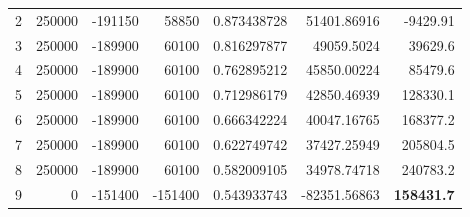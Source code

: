 \documentclass[12pt]{article}
\begin{document}
\begin{landscape}
\begin{table}[htbp]
\begin{tabular}{rrrrrrr}
    2     & 250000 & -191150 & 58850 & 0.873438728 & 51401.86916 & -9429.91 \\
    3     & 250000 & -189900 & 60100 & 0.816297877 & 49059.5024 & 39629.6 \\
    4     & 250000 & -189900 & 60100 & 0.762895212 & 45850.00224 & 85479.6 \\
    5     & 250000 & -189900 & 60100 & 0.712986179 & 42850.46939 & 128330.1 \\
    6     & 250000 & -189900 & 60100 & 0.666342224 & 40047.16765 & 168377.2 \\
    7     & 250000 & -189900 & 60100 & 0.622749742 & 37427.25949 & 205804.5 \\
    8     & 250000 & -189900 & 60100 & 0.582009105 & 34978.74718 & 240783.2 \\
    9     & 0     & -151400 & -151400 & 0.543933743 & -82351.56863 & \textbf{158431.7} \\
    \bottomrule
    \end{tabular}%
  \label{tab:addlabel}%
\end{table}%

\end{landscape}

\begin{landscape}
\vspace*{\fill}
\vspace*{\fill}
\end{landscape}



\end{document}
